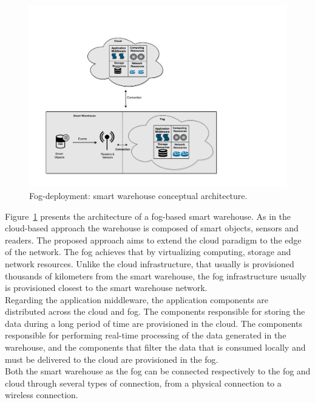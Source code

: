 \begin{figure}[ht!]
\centering
\includegraphics[width=\textwidth]{./images/solution_fog_architecture}
\caption[Fog-deployment: conceptual architecture.]{Fog-deployment: smart warehouse conceptual architecture.}
\label{fig:solution_fog_architecture}
\end{figure}

Figure~\ref{fig:solution_fog_architecture} presents the architecture of a fog-based smart warehouse.
As in the cloud-based approach the warehouse is composed of smart objects, sensors and readers.
The proposed approach aims to extend the cloud paradigm to the edge of the network. The fog achieves
that by virtualizing computing, storage and network resources. Unlike the cloud infrastructure, that
usually is provisioned thousands of kilometers from the smart warehouse, the fog infrastructure
usually is provisioned closest to the smart warehouse network.\\

Regarding the application middleware, the application components are distributed across the cloud and
fog. The components responsible for storing the data during a long period of time are provisioned in
the cloud. The components responsible for performing real-time processing of the data generated in the
warehouse, and the components that filter the data that is consumed locally and must be delivered to
the cloud are provisioned in the fog.\\

Both the smart warehouse as the fog can be connected respectively to the fog and cloud through
several types of connection, from a physical connection to a wireless connection.

